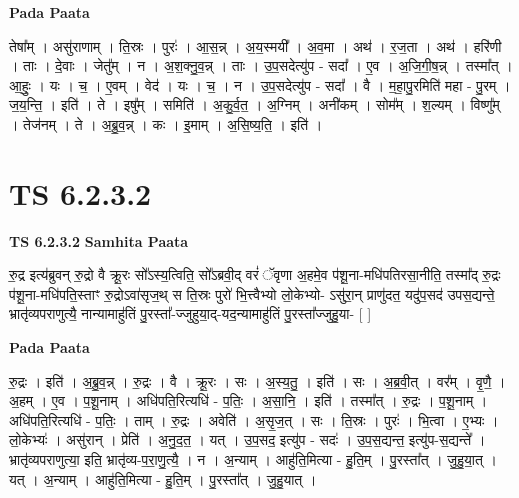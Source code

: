 \documentclass[17pt]{extarticle}
\begin{document}
\textbf{Pada Paata} \newline

तेषा᳚म् । असु॑राणाम् । ति॒स्रः । पुरः॑ । आ॒स॒न्न् । अ॒य॒स्मयी᳚ । अ॒व॒मा । अथ॑ । र॒ज॒ता । अथ॑ । हरि॑णी । ताः । दे॒वाः । जेतु᳚म् । न । अ॒श॒क्नु॒व॒न्न् । ताः । उ॒प॒सदेत्यु॑प - सदा᳚ । ए॒व । अ॒जि॒गी॒ष॒न्न् । तस्मा᳚त् । आ॒हुः॒ । यः । च॒ । ए॒वम् । वेद॑ । यः । च॒ । न । उ॒प॒सदेत्यु॑प - सदा᳚ । वै । म॒हा॒पु॒रमिति॑ महा - पु॒रम् । ज॒य॒न्ति॒ । इति॑ । ते । इषु᳚म् । समिति॑ । अ॒कु॒र्व॒त॒ । अ॒ग्निम् । अनी॑कम् । सोम᳚म् । श॒ल्यम् । विष्णु᳚म् । तेज॑नम् । ते । अ॒ब्रु॒व॒न्न् । कः । इ॒माम् । अ॒सि॒ष्य॒ति॒ । इति॑ ।  \newline




\section*{ TS 6.2.3.2 }

\textbf{TS 6.2.3.2 } \newline
\textbf{Samhita Paata} \newline

रु॒द्र इत्य॑ब्रुवन् रु॒द्रो वै क्रू॒रः सो᳚ऽस्य॒त्विति॒ सो᳚ऽब्रवी॒द् वरं॑ ॅवृणा अ॒हमे॒व प॑शू॒ना-मधि॑पतिरसा॒नीति॒ तस्मा᳚द् रु॒द्रः प॑शू॒ना-मधि॑पति॒स्ताꣳ रु॒द्रोऽवा॑सृज॒थ् स ति॒स्रः पुरो॑ भि॒त्त्वैभ्यो लो॒केभ्यो- ऽसु॑रा॒न् प्राणु॑दत॒ यदु॑प॒सद॑ उपस॒द्यन्ते॒ भ्रातृ॑व्यपराणुत्यै॒ नान्यामाहु॑तिं पु॒रस्ता᳚-ज्जुहुया॒द्-यद॒न्यामाहु॑तिं पु॒रस्ता᳚ज्जुहु॒या- [  ] \newline

\textbf{Pada Paata} \newline

रु॒द्रः । इति॑ । अ॒ब्रु॒व॒न्न् । रु॒द्रः । वै । क्रू॒रः । सः । अ॒स्य॒तु॒ । इति॑ । सः । अ॒ब्र॒वी॒त् । वर᳚म् । वृ॒णै॒ । अ॒हम् । ए॒व । प॒शू॒नाम् । अधि॑पति॒रित्यधि॑ - प॒तिः॒ । अ॒सा॒नि॒ । इति॑ । तस्मा᳚त् । रु॒द्रः । प॒शू॒नाम् । अधि॑पति॒रित्यधि॑ - प॒तिः॒ । ताम् । रु॒द्रः । अवेति॑ । अ॒सृ॒ज॒त् । सः । ति॒स्रः । पुरः॑ । भि॒त्वा । ए॒भ्यः । लो॒केभ्यः॑ । असु॑रान् । प्रेति॑ । अ॒नु॒द॒त॒ । यत् । उ॒प॒सद॒ इत्यु॑प - सदः॑ । उ॒प॒स॒द्यन्त॒ इत्यु॑प-स॒द्यन्ते᳚ । भ्रातृ॑व्यपराणुत्या॒ इति॒ भ्रातृ॑व्य-प॒रा॒णु॒त्यै॒ । न । अ॒न्याम् । आहु॑ति॒मित्या - हु॒ति॒म् । पु॒रस्ता᳚त् । जु॒हु॒या॒त् । यत् । अ॒न्याम् । आहु॑ति॒मित्या - हु॒ति॒म् । पु॒रस्ता᳚त् । जु॒हु॒यात् ।  \newline




\end{document}
